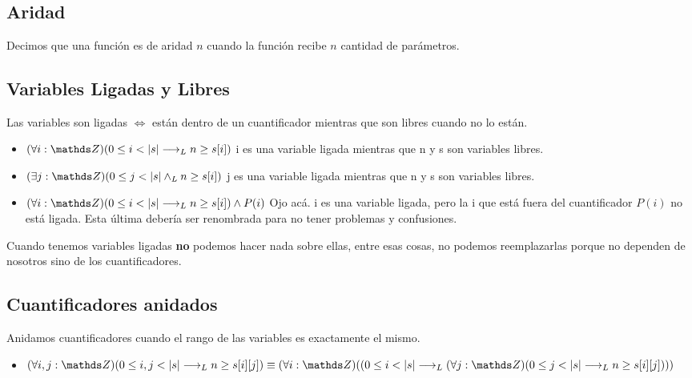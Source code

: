 \documentclass[10pt,a4paper]{article}
\begin{document}
\leavevmode
\\



\subsection*{Aridad}
Decimos que una función es de aridad \(n\) cuando la función recibe \(n\) cantidad de parámetros.

\subsection*{Variables Ligadas y Libres}
Las variables son ligadas \(\iff\) están dentro de un cuantificador mientras que son libres cuando no lo están.
\begin{itemize}
    \item \((\forall i: \ent)(0 \le i < \longitud{s} \implicaLuego n \ge s[i])\) i es una variable ligada mientras que n y s son variables libres.
    \item \((\exists j: \ent)(0 \le j < \longitud{s} \yLuego n \ge s[i])\) j es una variable ligada mientras que n y s son variables libres.
    \item \((\forall i: \ent)(0 \le i < \longitud{s} \implicaLuego n \ge s[i]) \land P(i)\) Ojo acá. i es una variable ligada, pero la i que está fuera del cuantificador \(P(i)\) no está ligada. Esta última debería ser renombrada para no tener problemas y confusiones.
\end{itemize}

Cuando tenemos variables ligadas \textbf{no} podemos hacer nada sobre ellas, entre esas cosas, no podemos reemplazarlas porque no dependen de nosotros sino de los cuantificadores.

\subsection*{Cuantificadores anidados}
Anidamos cuantificadores cuando el rango de las variables es exactamente el mismo.
\begin{itemize}
    \item \((\forall i, j: \ent)(0 \le i, j < \longitud{s} \implicaLuego n \ge s[i][j]) \equiv (\forall i: \ent)((0 \le i < \longitud{s}\implicaLuego (\forall  j: \ent)(0 \le j < \longitud{s} \implicaLuego n \ge s[i][j]))) \) 
\end{itemize}
\end{document}
